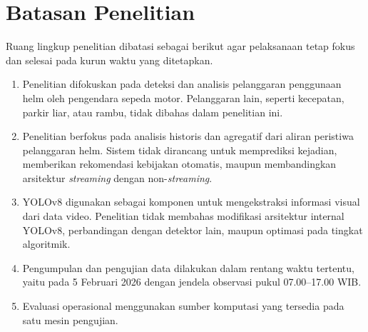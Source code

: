 \section{Batasan Penelitian}
\label{section:batasanpenelitian}

Ruang lingkup penelitian dibatasi sebagai berikut agar pelaksanaan tetap fokus
dan selesai pada kurun waktu yang ditetapkan.

\begin{enumerate}
  \item Penelitian difokuskan pada deteksi dan analisis pelanggaran penggunaan helm oleh pengendara sepeda motor. Pelanggaran lain, seperti kecepatan, parkir liar, atau rambu, tidak dibahas dalam penelitian ini.

  \item Penelitian berfokus pada analisis historis dan agregatif dari aliran peristiwa pelanggaran helm. Sistem tidak dirancang untuk memprediksi kejadian, memberikan rekomendasi kebijakan otomatis, maupun membandingkan arsitektur \textit{streaming} dengan non-\textit{streaming}.

  \item YOLOv8 digunakan sebagai komponen untuk mengekstraksi informasi visual dari data video. Penelitian tidak membahas modifikasi arsitektur internal YOLOv8, perbandingan dengan detektor lain, maupun optimasi pada tingkat algoritmik.

  \item Pengumpulan dan pengujian data dilakukan dalam rentang waktu tertentu, yaitu pada 5 Februari 2026 dengan jendela observasi pukul 07.00--17.00 WIB.

  \item Evaluasi operasional menggunakan sumber komputasi yang tersedia pada satu mesin pengujian.
\end{enumerate}




